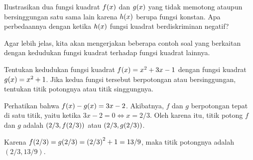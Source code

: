 		\begin{explbox}
			Ilustrasikan dua fungsi kuadrat $ \mathop{}\!{f}{\left({x}\right)} $ dan $ \mathop{}\!{g}{\left({x}\right)} $ yang tidak memotong ataupun bersinggungan satu sama lain karena $ \mathop{}\!{h}{\left({x}\right)} $ berupa fungsi konstan. Apa perbedaannya dengan ketika $ \mathop{}\!{h}{\left({x}\right)} $ fungsi kuadrat berdiskriminan negatif?
		\end{explbox}
		
		\par Agar lebih jelas, kita akan mengerjakan beberapa contoh soal yang berkaitan dengan kedudukan fungsi kuadrat terhadap fungsi kuadrat lainnya.
		
		\begin{contoh}
			Tentukan kedudukan fungsi kuadrat $ \mathop{}\!{f}{\left({x}\right)} = x^{2} + 3x - 1 $ dengan fungsi kuadrat $ \mathop{}\!{g}{\left({x}\right)} = x^{2} + 1 $. Jika kedua fungsi tersebut berpotongan atau bersinggungan, tentukan titik potongnya atau titik singgungnya.
		\end{contoh}
		\begin{jawab}
			Perhatikan bahwa $ \mathop{}\!{f}{\left({x}\right)} - \mathop{}\!{g}{\left({x}\right)} = 3x - 2 $. Akibatnya, $ f $ dan $ g $ berpotongan tepat di satu titik, yaitu ketika $ 3x - 2 = 0 \iff x = 2/3 $. Oleh karena itu, titik potong $ f $ dan $ g $ adalah $ \left(2/3, \mathop{}\!{f}{\left({2/3}\right)}\right) $ atau $ \left(2/3, \mathop{}\!{g}{\left({2/3}\right)}\right) $.
			\par Karena $ \mathop{}\!{f}{\left({2/3}\right)} = \mathop{}\!{g}{\left({2/3}\right)} = \left(2/3\right)^{2} + 1 = 13/9 $, maka titik potongnya adalah $ \left(2/3, 13/9\right) $.
		\end{jawab}
		
